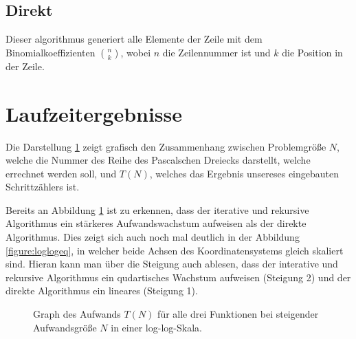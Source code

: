\documentclass[paper=a4, fontsize=11pt]{scrartcl} %
\numberwithin{equation}{section} %
\numberwithin{figure}{section} %
\numberwithin{table}{section} %
\begin{document}
\subsection{Direkt}
Dieser algorithmus generiert alle Elemente der Zeile mit dem Binomialkoeffizienten
$\binom{n}{k}$, wobei $n$ die Zeilennummer ist und $k$ die Position in der Zeile.

\section{Laufzeitergebnisse}

Die Darstellung \ref{figure:loglog} zeigt grafisch den Zusammenhang zwischen
Problemgr\"o{\ss}e $N$, welche die Nummer des Reihe des Pascalschen Dreiecks darstellt,
welche errechnet werden soll, und $T(N)$, welches das Ergebnis unsereses eingebauten
Schrittz\"ahlers ist.

Bereits an Abbildung \ref{figure:loglog} ist zu erkennen, dass der iterative und rekursive
Algorithmus ein st\"arkeres Aufwandswachstum aufweisen als der direkte Algorithmus.
Dies zeigt sich auch noch mal deutlich in der Abbildung \ref{figure:loglogeq},
in welcher beide Achsen des Koordinatensystems gleich skaliert sind. Hieran kann
man \"uber die Steigung auch ablesen, dass der interative und rekursive Algorithmus
ein qudartisches Wachstum aufweisen (Steigung 2) und der direkte Algorithmus
ein lineares (Steigung 1).

\begin{figure}[h]
  \centering
  \caption{Graph des Aufwands $T(N)$ f\"ur alle drei Funktionen bei steigender Aufwandsgr\"o{\ss}e $N$ in einer log-log-Skala.}
  \label{figure:loglog}
\end{figure}
\end{document}
